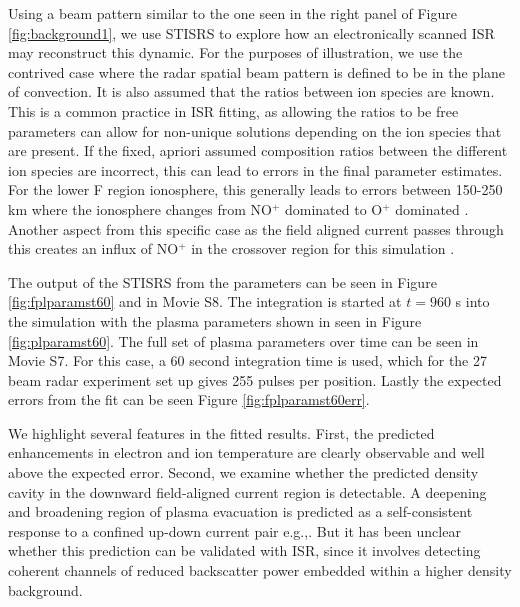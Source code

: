 \documentclass[draft,ras]{agutex}
\begin{document}
\begin{article}
Using a beam pattern similar to the one seen in the right panel of Figure \ref{fig:background1}, we use STISRS to explore how an electronically scanned ISR may reconstruct this dynamic.  For the purposes of illustration, we use the contrived case where the radar spatial beam pattern is defined to be in the plane of convection.  It is also assumed that the ratios between ion species are known. This is a common practice in ISR fitting, as allowing the ratios to be free parameters can allow for non-unique solutions depending on the ion species that are present. If the fixed, apriori assumed composition ratios between the different ion species are incorrect, this can lead to errors in the final parameter estimates. For the lower F region ionosphere, this generally leads to errors between 150-250 km where the ionosphere changes from NO$^+$ dominated to O$^+$ dominated \citep{Zettergren:2011ej, Blelly:2010gf}. Another aspect from this specific case as the field aligned current passes through this creates an influx of  NO$^+$ in the crossover region for this simulation \citet{Perry:2015jf}.

The output of the STISRS from the parameters can be seen in Figure \ref{fig:fplparamst60} and in Movie S8. The integration is started at $t=960$ s into the simulation with the plasma parameters shown in seen in Figure \ref{fig:plparamst60}. The full set of plasma parameters over time can be seen in Movie S7. For this case, a 60 second integration time is used, which for the 27 beam radar experiment set up gives 255 pulses per position. Lastly the expected errors from the fit can be seen Figure \ref{fig:fplparamst60err}.

We highlight several features in the fitted results. First, the predicted enhancements in electron and ion temperature are clearly observable and well above the expected error. Second, we examine whether the predicted density cavity in the downward field-aligned current region is  detectable.  A deepening and broadening region of plasma evacuation is predicted as a self-consistent response to a confined up-down current pair e.g.,\citep{Wright:2003ch}.  But it has been unclear whether this prediction can be validated with ISR, since it involves detecting coherent channels of reduced backscatter power embedded within a higher density background.


\end{article}
\end{document}
